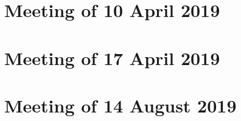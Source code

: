 \documentclass[../main/main.tex]{subfiles}
\begin{document}
\section{Meeting of 10 April 2019}
\section{Meeting of 17 April 2019}
\section{Meeting of 14 August 2019}
\end{document}
